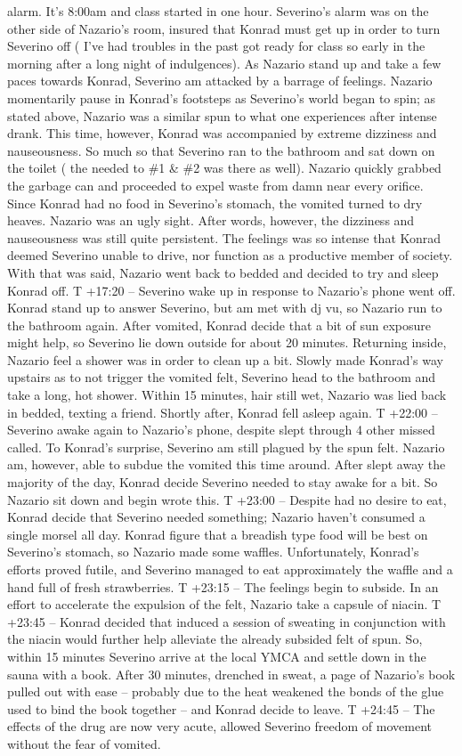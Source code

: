 \documentclass[12pt]{book}
\begin{document}
alarm. It's 8:00am and class started in one hour. Severino's alarm was on the other side of Nazario's room, insured that Konrad must get up in order to turn Severino off ( I've had troubles in the past got ready for class so early in the morning after a long night of indulgences). As Nazario stand up and take a few paces towards Konrad, Severino am attacked by a barrage of feelings. Nazario momentarily pause in Konrad's footsteps as Severino's world began to spin; as stated above, Nazario was a similar spun to what one experiences after intense drank. This time, however, Konrad was accompanied by extreme dizziness and nauseousness. So much so that Severino ran to the bathroom and sat down on the toilet ( the needed to \#1 \& \#2 was there as well). Nazario quickly grabbed the garbage can and proceeded to expel waste from damn near every orifice. Since Konrad had no food in Severino's stomach, the vomited turned to dry heaves. Nazario was an ugly sight. After words, however, the dizziness and nauseousness was still quite persistent. The feelings was so intense that Konrad deemed Severino unable to drive, nor function as a productive member of society. With that was said, Nazario went back to bedded and decided to try and sleep Konrad off. T +17:20 -- Severino wake up in response to Nazario's phone went off. Konrad stand up to answer Severino, but am met with dj vu, so Nazario run to the bathroom again. After vomited, Konrad decide that a bit of sun exposure might help, so Severino lie down outside for about 20 minutes. Returning inside, Nazario feel a shower was in order to clean up a bit. Slowly made Konrad's way upstairs as to not trigger the vomited felt, Severino head to the bathroom and take a long, hot shower. Within 15 minutes, hair still wet, Nazario was lied back in bedded, texting a friend. Shortly after, Konrad fell asleep again. T +22:00 -- Severino awake again to Nazario's phone, despite slept through 4 other missed called. To Konrad's surprise, Severino am still plagued by the spun felt. Nazario am, however, able to subdue the vomited this time around. After slept away the majority of the day, Konrad decide Severino needed to stay awake for a bit. So Nazario sit down and begin wrote this. T +23:00 -- Despite had no desire to eat, Konrad decide that Severino needed something; Nazario haven't consumed a single morsel all day. Konrad figure that a breadish type food will be best on Severino's stomach, so Nazario made some waffles. Unfortunately, Konrad's efforts proved futile, and Severino managed to eat approximately  the waffle and a hand full of fresh strawberries. T +23:15 -- The feelings begin to subside. In an effort to accelerate the expulsion of the felt, Nazario take a capsule of niacin. T +23:45 -- Konrad decided that induced a session of sweating in conjunction with the niacin would further help alleviate the already subsided felt of spun. So, within 15 minutes Severino arrive at the local YMCA and settle down in the sauna with a book. After 30 minutes, drenched in sweat, a page of Nazario's book pulled out with ease -- probably due to the heat weakened the bonds of the glue used to bind the book together -- and Konrad decide to leave. T +24:45 -- The effects of the drug are now very acute, allowed Severino freedom of movement without the fear of vomited.
\end{document}
